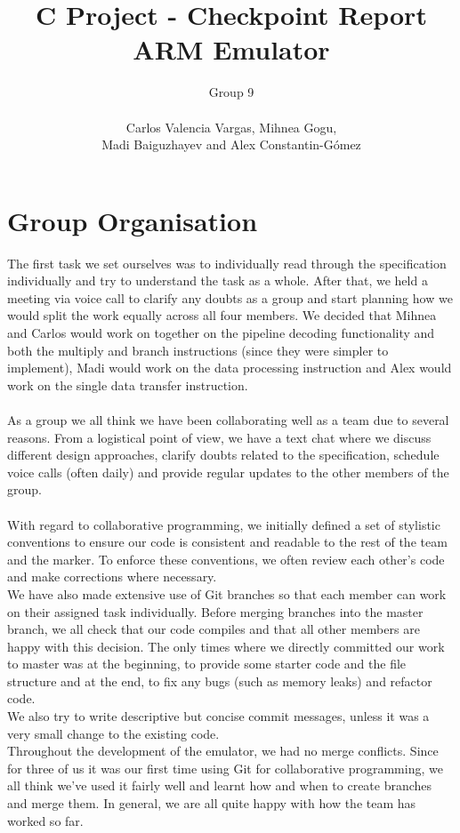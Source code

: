 \documentclass[11pt]{article}
\begin{document}
\title{%
  C Project - Checkpoint Report \\
  \large ARM Emulator}
\author{Group 9\\\\Carlos Valencia Vargas, Mihnea Gogu,\\Madi Baiguzhayev and Alex Constantin-G\'omez}

\maketitle

\section{Group Organisation}
The first task we set ourselves was to individually read through the specification individually and try to understand the task as a whole.  After that, we held a meeting via voice call to clarify any doubts as a group and start planning how we would split the work equally across all four members. We decided that Mihnea and Carlos would work on together on the pipeline decoding functionality and both the multiply and branch instructions (since they were simpler to implement), Madi would work on the data processing instruction and Alex would work on the single data transfer instruction.\\\\
As a group we all think we have been collaborating well as a team due to several reasons. From a logistical point of view, we have a text chat where we discuss different design approaches, clarify doubts related to the specification, schedule voice calls (often daily) and provide regular updates to the other members of the group.\\\\
With regard to collaborative programming, we initially defined a set of stylistic conventions to ensure our code is consistent and readable to the rest of the team and the marker. To enforce these conventions, we often review each other’s code and make corrections where necessary.\\
We have also made extensive use of Git branches so that each member can work on their assigned task individually. Before merging branches into the master branch, we all check that our code compiles and that all other members are happy with this decision. The only times where we directly committed our work to master was at the beginning, to provide some starter code and the file structure and at the end, to fix any bugs (such as memory leaks) and refactor code.\\
We also try to write descriptive but concise commit messages, unless it was a very small change to the existing code.\\
Throughout the development of the emulator, we had no merge conflicts. Since for three of us it was our first time using Git for collaborative programming, we all think we’ve used it fairly well and learnt how and when to create branches and merge them. In general, we are all quite happy with how the team has worked so far.
\end{document}
